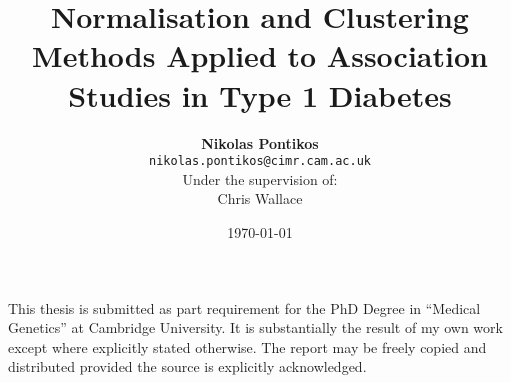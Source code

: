 \documentclass[12pt,a4paper,table,twoside]{report}
\begin{document}

\title{
  Normalisation and Clustering Methods Applied to Association Studies in Type 1 Diabetes
}

\author{
\textbf{Nikolas Pontikos}\\
\texttt{nikolas.pontikos@cimr.cam.ac.uk}\\
Under the supervision of:\\
Chris Wallace \\
}
\date{\today}
\maketitle

\begin{small}
This thesis is submitted as part requirement for the PhD Degree in ``Medical Genetics'' at Cambridge University.
It is substantially the result of my own work except where explicitly stated otherwise.
The report may be freely copied and distributed provided the source is explicitly acknowledged.
\end{small}


\newpage
\thispagestyle{empty} 
\vspace*{\fill}
\begin{center}
\end{center}
\vspace*{\fill}
\clearpage
\end{document}

